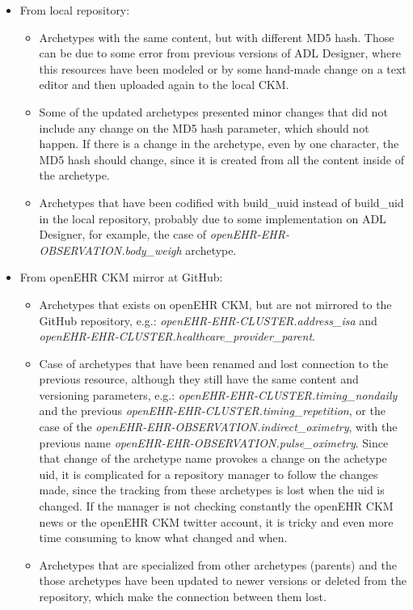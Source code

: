 \documentclass[mim_thesis.tex]{subfiles}
\begin{document}
\begin{itemize}[noitemsep]
\item From local repository:
\begin{itemize}[noitemsep]
\item Archetypes with the same content, but with different MD5 hash. Those can be due to some error from previous versions of ADL Designer, where this resources have been modeled or by some hand-made change on a text editor and then uploaded again to the local CKM. 
\item Some of the updated archetypes presented minor changes that did not include any change on the MD5 hash parameter, which should not happen. If there is a change in the archetype, even by one character, the MD5 hash should change, since it is created from all the content inside of the archetype.
\item Archetypes that have been codified with build\_uuid instead of build\_uid in the local repository, probably due to some implementation on ADL Designer, for example, the case of \textit{openEHR-EHR-OBSERVATION.body\_weigh} archetype.

\end{itemize}
\item From openEHR CKM mirror at GitHub:
\begin{itemize}[noitemsep]
\item Archetypes that exists on openEHR CKM, but are not mirrored to the GitHub repository, e.g.: \textit{openEHR-EHR-CLUSTER.address\_isa} and \textit{openEHR-EHR-CLUSTER.healthcare\_provider\_parent}.
\item Case of archetypes that have been renamed and lost connection to the previous resource, although they still have the same content and versioning parameters, e.g.: \textit{openEHR-EHR-CLUSTER.timing\_nondaily} and the previous \textit{openEHR-EHR-CLUSTER.timing\_repetition}, or the case of the \textit{openEHR-EHR-OBSERVATION.indirect\_oximetry}, with the previous name \textit{openEHR-EHR-OBSERVATION.pulse\_oximetry}. Since that change of the archetype name provokes a change on the achetype uid, it is complicated for a repository manager to follow the changes made, since the tracking from these archetypes is lost when the uid is changed. If the manager is not checking constantly the openEHR CKM news or the openEHR CKM twitter account, it is tricky and even more time consuming to know what changed and when.
\item Archetypes that are specialized from other archetypes (parents) and the those archetypes have been updated to newer versions or deleted from the repository, which make the connection between them lost.
\end{itemize}
\end{itemize}
\end{document}

